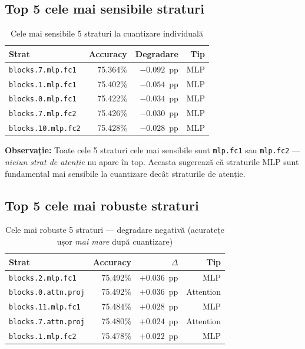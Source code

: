 \documentclass[12pt,a4paper]{article}
\begin{document}
\subsection{Top 5 cele mai sensibile straturi}

\begin{table}[H]
  \centering
  \caption{Cele mai sensibile 5 straturi la cuantizare individuală}
  \begin{tabular}{lrrr}
    \toprule
    \textbf{Strat} & \textbf{Accuracy} & \textbf{Degradare} &
    \textbf{Tip} \\
    \midrule
    \texttt{blocks.7.mlp.fc1}   & 75.364\% & $-0.092$~pp & MLP \\
    \texttt{blocks.1.mlp.fc1}   & 75.402\% & $-0.054$~pp & MLP \\
    \texttt{blocks.0.mlp.fc1}   & 75.422\% & $-0.034$~pp & MLP \\
    \texttt{blocks.7.mlp.fc2}   & 75.426\% & $-0.030$~pp & MLP \\
    \texttt{blocks.10.mlp.fc2}  & 75.428\% & $-0.028$~pp & MLP \\
    \bottomrule
  \end{tabular}
  \label{tab:top5_sensitive}
\end{table}

\textbf{Observație:} Toate cele 5 straturi cele mai sensibile sunt
\texttt{mlp.fc1} sau \texttt{mlp.fc2} --- \emph{niciun strat de atenție}
nu apare în top. Aceasta sugerează că straturile MLP sunt fundamental mai
sensibile la cuantizare decât straturile de atenție.

\subsection{Top 5 cele mai robuste straturi}

\begin{table}[H]
  \centering
  \caption{Cele mai robuste 5 straturi --- degradare negativă (acuratețe
    ușor \emph{mai mare} după cuantizare)}
  \begin{tabular}{lrrr}
    \toprule
    \textbf{Strat} & \textbf{Accuracy} & \textbf{$\Delta$} &
    \textbf{Tip} \\
    \midrule
    \texttt{blocks.2.mlp.fc1}    & 75.492\% & $+0.036$~pp & MLP \\
    \texttt{blocks.0.attn.proj}  & 75.492\% & $+0.036$~pp & Attention \\
    \texttt{blocks.11.mlp.fc1}   & 75.484\% & $+0.028$~pp & MLP \\
    \texttt{blocks.7.attn.proj}  & 75.480\% & $+0.024$~pp & Attention \\
    \texttt{blocks.1.mlp.fc2}    & 75.478\% & $+0.022$~pp & MLP \\
    \bottomrule
  \end{tabular}
  \label{tab:top5_robust}
\end{table}
\end{document}
